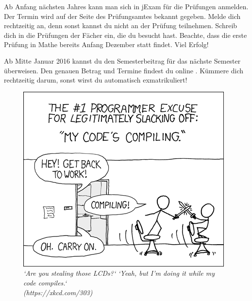 \begin{itemize}[leftmargin=*]
\newpage


Ab Anfang nächsten Jahres kann man sich in jExam für die Prüfungen anmelden. Der Termin wird auf der Seite des Prüfungsamtes bekannt gegeben. Melde dich rechtzeitig an, denn sonst kannst du nicht an der Prüfung teilnehmen.
Schreib dich in die Prüfungen der Fächer ein, die du besucht hast.
Beachte, dass die erste Prüfung in Mathe bereits Anfang Dezember statt findet.
Viel Erfolg!

Ab Mitte Januar 2016 kannst du den Semesterbeitrag für das nächste Semester überweisen.
Den genauen Betrag und Termine findest du online .
Kümmere dich rechtzeitig darum, sonst wirst du automatisch exmatrikuliert!

\end{itemize}

\vfill

\begin{figure}[h!]
\centering
\includegraphics[scale=.4]{img/xkcd/compiling.png}
\caption*{{\small \textit{`Are you stealing those LCDs?` `Yeah, but I'm doing it while my code compiles.`\\\hspace*{1mm}\hfill(https://xkcd.com/303)}}}
\end{figure}
